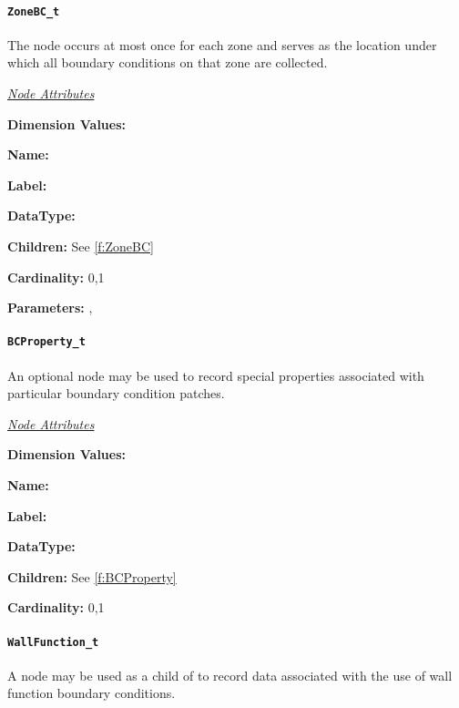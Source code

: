 \paragraph{\texttt{ZoneBC\_t}}

The  node occurs at most once for each zone and serves
as the location under which all boundary conditions on that zone are
collected.

\textit{\uline{Node Attributes}}
\begin{Ventryic}{\textbf{Dimension Values:}}
\item [\textbf{Name:}]
\item [\textbf{Label:}]
\item [\textbf{DataType:}]
\item [\textbf{Children:}]
      See \autoref{f:ZoneBC}
\item [\textbf{Cardinality:}]
      0,1
\item [\textbf{Parameters:}]
      , 
\end{Ventryic}

\paragraph{\texttt{BCProperty\_t}}

An optional  node may be used to record special
properties associated with particular boundary condition patches.

\textit{\uline{Node Attributes}}
\begin{Ventryic}{\textbf{Dimension Values:}}
\item [\textbf{Name:}]
\item [\textbf{Label:}]
\item [\textbf{DataType:}]
\item [\textbf{Children:}]
      See \autoref{f:BCProperty}
\item [\textbf{Cardinality:}]
      0,1
\end{Ventryic}

\paragraph{\texttt{WallFunction\_t}}

A  node may be used as a child of
 to record data associated with the use of wall
function boundary conditions.

